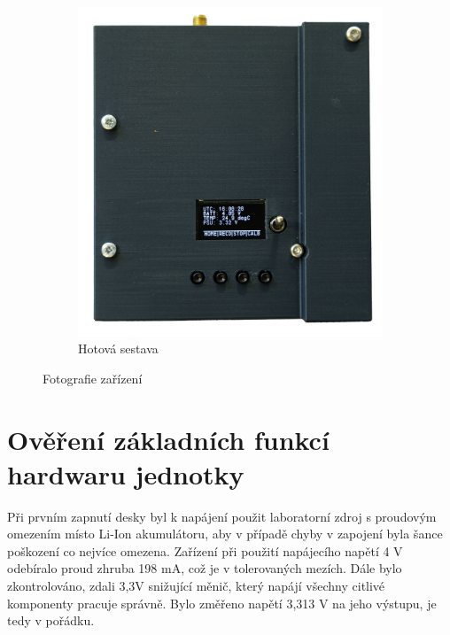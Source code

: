 \begin{figure}
\begin{subfigure}[b]{0.4\textwidth}
     \end{subfigure}
     \hfill
     \begin{subfigure}[b]{0.4\textwidth}
         \centering
         \includegraphics[width=\textwidth]{obrazky/ImunavFront}
         \caption{Hotová sestava}
         
     \end{subfigure}
        \caption{Fotografie zařízení}
        \label{fig:boxPhoto}
\end{figure}

\section{Ověření základních funkcí hardwaru jednotky}
Při prvním zapnutí desky byl k napájení použit laboratorní zdroj s proudovým omezením místo Li-Ion akumulátoru, aby v případě chyby v zapojení byla šance poškození co nejvíce omezena. Zařízení při použití napájecího napětí 4 V odebíralo proud zhruba 198 mA, což je v tolerovaných mezích. Dále bylo zkontrolováno, zdali 3,3V snižující měnič, který napájí všechny citlivé komponenty pracuje správně. Bylo změřeno napětí 3,313 V na jeho výstupu, je tedy v pořádku.

